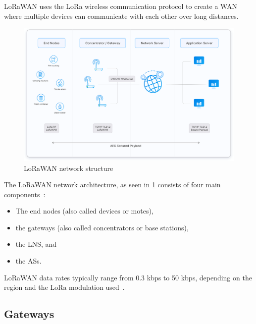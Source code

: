 \ac{LoRaWAN} uses the LoRa wireless communication protocol to create a \ac{WAN} where multiple devices can communicate with each other over long distances.

\begin{figure}[h]
    \centering
    \includegraphics[width=1\textwidth]{pictures/lorawan-structure/lorawan-architecture.png}
    \caption{\ac{LoRaWAN} network structure~\protect\cite{the_things_industries_bv_lorawan_nodate}}\label{pic:lorawan-network-structure}
\end{figure}

The \ac{LoRaWAN} network architecture, as seen in \cref{pic:lorawan-network-structure} consists of four main components~\cite[p. 8]{lora_alliance_inc_lorawan_2017}:

\begin{itemize}
    \item The end nodes (also called devices or motes),
    \item the gateways (also called concentrators or base stations),
    \item the \ac{LNS}, and
    \item the \acp{AS}.
\end{itemize}

\ac{LoRaWAN} data rates typically range from 0.3 kbps to 50 kbps, depending on the region and the \ac{LoRa} modulation used~\cite[p. 8]{lora_alliance_inc_lorawan_2017}.

\subsection{Gateways}

